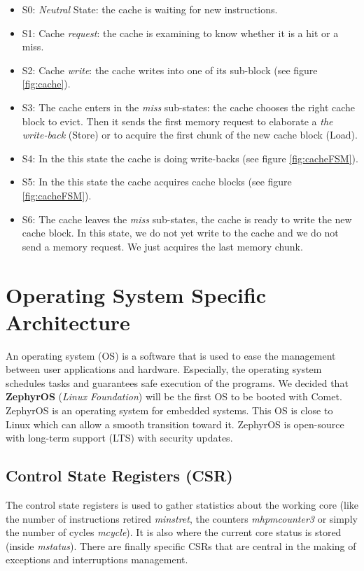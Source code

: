 \documentclass[10pt,letterpaper]{article}
\begin{document}
\begin{itemize}
    \item S0: \textit{Neutral} State: the cache is waiting for new instructions.
    \item S1: Cache \textit{request}: the cache is examining to know whether it is a hit or a miss.
    \item S2: Cache \textit{write}: the cache writes into one of its sub-block (see figure \ref{fig:cache}).
    \item S3: The cache enters in the \textit{miss} sub-states: the cache chooses the right cache block to evict. Then it sends the first memory request to elaborate a \textit{the write-back} (Store) or to acquire the first chunk of the new cache block (Load).
    \item S4: In the this state the cache is doing write-backs (see figure \ref{fig:cacheFSM}).
    \item S5: In the this state the cache acquires cache blocks (see figure \ref{fig:cacheFSM}).
    \item S6: The cache leaves the \textit{miss} sub-states, the cache is ready to write the new cache block. In this state, we do not yet write to the cache and we do not send a memory request. We just acquires the last memory chunk. 
\end{itemize}

\newpage

\section{Operating System Specific Architecture}\vspace{0.3cm}

An operating system (OS) is a software that is used to ease the management between user applications and hardware. Especially, the operating system schedules tasks and guarantees safe execution of the programs. We decided that \textbf{ZephyrOS} (\textit{Linux Foundation}) will be the first OS to be booted with Comet. ZephyrOS is an operating system for embedded systems. This OS is close to Linux which can allow a smooth transition toward it. ZephyrOS is open-source with long-term support (LTS) with security updates.

\subsection{Control State Registers (CSR)}

The control state registers is used to gather statistics about the working core (like the number of instructions retired \textit{minstret}, the counters \textit{mhpmcounter3} or simply the number of cycles \textit{mcycle}). It is also where the current core status is stored (inside \textit{mstatus}). There are finally specific CSRs that are central in the making of exceptions and interruptions management. 
\end{document}

